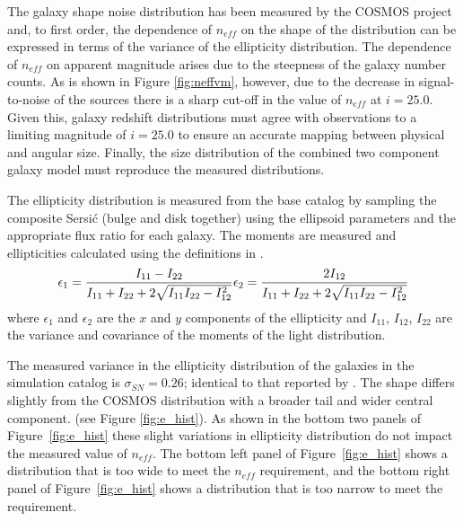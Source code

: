 \documentclass[11pt]{article}
\begin{document}
The galaxy shape noise distribution has been measured by the COSMOS
project \citep{cosmos} and, to first order, the dependence of
$n_{eff}$ on the shape of the distribution can be expressed in terms
of the variance of the ellipticity distribution. The dependence of
$n_{eff}$ on apparent magnitude arises due to the steepness of the
galaxy number counts. As is shown in Figure \ref{fig:neffvm}, however,
due to the decrease in signal-to-noise of the sources there is a sharp
cut-off in the value of $n_{eff}$ at $i=25.0$.  Given this, galaxy
redshift distributions must agree with observations to a limiting
magnitude of $i=25.0$ to ensure an accurate mapping between physical
and angular size.  Finally, the size distribution of the combined two
component galaxy model must reproduce the measured distributions.

The ellipticity distribution is measured from the base catalog by
sampling the composite Sersi{\'c} (bulge and disk together) using the
ellipsoid parameters and the appropriate flux ratio for each galaxy.
The moments are measured and ellipticities calculated using the
definitions in \citet{chang}.
\begin{equation}
\epsilon_1 = \frac{I_{11}-I_{22}}{I_{11}+I_{22}+2\sqrt{I_{11}I_{22} - I^{2}_{12}}}\\
\epsilon_2 = \frac{2I_{12}}{I_{11}+I_{22}+2\sqrt{I_{11}I_{22} - I^{2}_{12}}}
\end{equation}
where $\epsilon_1$ and $\epsilon_2$ are the $x$ and $y$ components of
the ellipticity and $I_{11}$, $I_{12}$, $I_{22}$ are the variance and
covariance of the moments of the light distribution.

The measured variance in the ellipticity distribution of the galaxies
in the simulation catalog is $\sigma_{SN} = 0.26$; identical to that
reported by \citet{chang}. The shape differs slightly from the COSMOS
distribution with a broader tail and wider central component. (see
Figure \ref{fig:e_hist}).  As shown in the bottom two panels of
Figure~\ref{fig:e_hist} these slight variations in ellipticity
distribution do not impact the measured value of $n_{eff}$.  The
bottom left panel of Figure~\ref{fig:e_hist} shows a distribution that
is too wide to meet the $n_{eff}$ requirement, and the bottom right
panel of Figure~\ref{fig:e_hist} shows a distribution that is too
narrow to meet the requirement.
\end{document}
